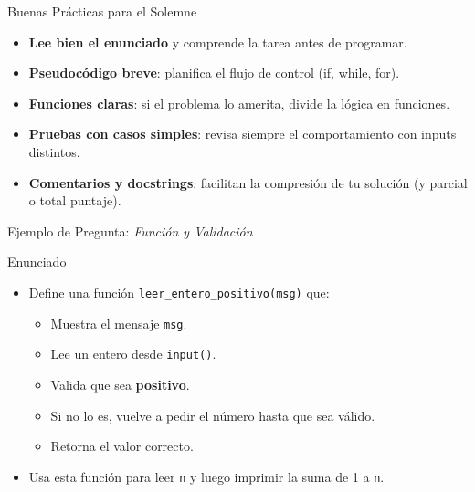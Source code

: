 \documentclass[10pt]{beamer}
\begin{document}
\begin{frame}{Buenas Prácticas para el Solemne}
  \begin{itemize}
    \item \textbf{Lee bien el enunciado} y comprende la tarea antes de programar.
    \item \textbf{Pseudocódigo breve}: planifica el flujo de control (if, while, for).
    \item \textbf{Funciones claras}: si el problema lo amerita, divide la lógica en funciones.
    \item \textbf{Pruebas con casos simples}: revisa siempre el comportamiento con inputs distintos.
    \item \textbf{Comentarios y docstrings}: facilitan la compresión de tu solución (y parcial o total puntaje).
  \end{itemize}
\end{frame}

\begin{frame}[fragile]{Ejemplo de Pregunta: \textit{Función y Validación}}
  \begin{block}{Enunciado}
    \begin{itemize}
      \item Define una función \texttt{leer\_entero\_positivo(msg)} que:
        \begin{itemize}
          \item Muestra el mensaje \texttt{msg}.
          \item Lee un entero desde \texttt{input()}.
          \item Valida que sea \textbf{positivo}.
          \item Si no lo es, vuelve a pedir el número hasta que sea válido.
          \item Retorna el valor correcto.
        \end{itemize}
      \item Usa esta función para leer \texttt{n} y luego imprimir la suma de 1 a \texttt{n}.
    \end{itemize}
  \end{block}
\end{frame}
\end{document}
